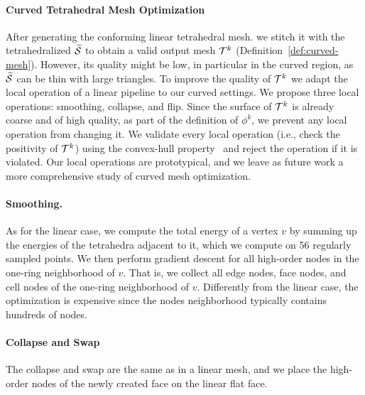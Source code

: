 \paragraph{Curved Tetrahedral Mesh Optimization}
After generating the conforming linear tetrahedral mesh. we stitch it with the tetrahedralized $\widetilde{\mathcal{S}}$ to obtain a valid output mesh $\mathcal{T}^k$ {(Definition~\ref{def:curved-mesh}).} However, its quality might be low, in particular in the curved region, as $\widetilde{\mathcal{S}}$ can be thin with large triangles. To improve the quality of  $\mathcal{T}^k$ we adapt the local operation of a linear pipeline to our curved settings. We propose three local operations: smoothing, collapse, and flip. 
Since the surface of $\mathcal{T}^k$ is already coarse {and} of high quality, {as} part of the definition of $\phi^k$, we prevent any local operation from changing it. We validate every local operation (i.e., check the positivity of $\mathcal{T}^k$) using the convex-hull property~\cite{johnen2013geometrical} and reject the operation if it is violated.
Our local operations are prototypical, and we leave as future work a more comprehensive study of curved mesh optimization.
 
\paragraph{Smoothing.} As for the linear case, we compute the total energy of a vertex $v$ by summing up the energies of the tetrahedra adjacent to it, which we compute on 56 regularly sampled points. 
We then perform gradient descent {for} all high-order nodes in the one-ring neighborhood of $v$. That is, we collect all edge nodes, face nodes, and cell nodes of the one-ring neighborhood of $v$. Differently {from} the linear case, the optimization is expensive since the nodes neighborhood typically contains hundreds of nodes.

\paragraph{Collapse and Swap}
The collapse and swap are the same as in a linear mesh, and we place the high-order nodes of the newly created face on the linear flat face.